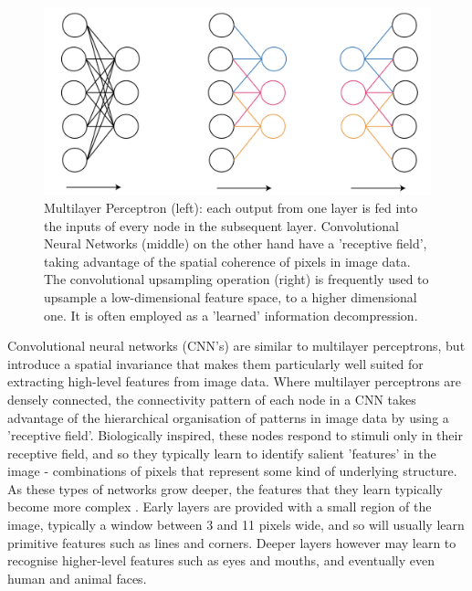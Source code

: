 \documentclass[openany]{book}
\begin{document}
\begin{figure}[tbp]
    \centering
    \includegraphics[width=5in]{images/cnnvsmlp.png}
    
    \caption{Multilayer Perceptron (left): each output from one layer is fed into the inputs of every node in the subsequent layer. Convolutional Neural Networks (middle) on the other hand have a 'receptive field', taking advantage of the spatial coherence of pixels in image data. The convolutional upsampling operation (right) is frequently used to upsample a low-dimensional feature space, to a higher dimensional one. It is often employed as a 'learned' information decompression.}
    
    \label{convexhull}
\end{figure}


Convolutional neural networks (CNN's) are similar to multilayer perceptrons, but introduce a spatial invariance that makes them particularly well suited for extracting high-level features from image data. Where multilayer perceptrons are densely connected, the connectivity pattern of each node in a CNN takes advantage of the hierarchical organisation of patterns in image data by using a 'receptive field'. Biologically inspired, these nodes respond to stimuli only in their receptive field, and so they typically learn to identify salient 'features' in the image - combinations of pixels that represent some kind of underlying structure. As these types of networks grow deeper, the features that they learn typically become more complex \cite{lecun1989cnn}. Early layers are provided with a small region of the image, typically a window between 3 and 11 pixels wide, and so will usually learn primitive features such as lines and corners. Deeper layers however may learn to recognise higher-level features such as eyes and mouths, and eventually even human and animal faces.
\end{document}
